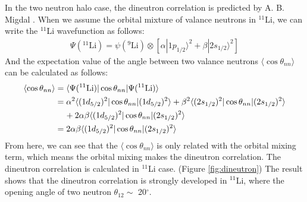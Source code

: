 

In the two neutron halo case, the dineutron correlation is predicted by A. B. Migdal \cite{Migdal}. 
When we assume the orbital mixture of valance neutrons in $^{11}$Li, we can write the $^{11}$Li wavefunction as follows:
\begin{align}
    \Psi(^{11}\text{Li}) = \psi(^{9}\text{Li}) \otimes [\alpha |1p_{1/2} \rangle^2 + \beta |2s_{1/2} \rangle^2]
\end{align}
And the expectation value of the angle between two valance neutrons $\langle \cos \theta_{nn} \rangle$ can be calculated as follows:
\begin{align}
    \langle \cos \theta_{nn} \rangle &= \langle \Psi({}^{11}\text{Li}) | \cos \theta_{nn} | \Psi({}^{11}\text{Li}) \rangle \notag \\
    &= \alpha^2 \langle (1d_{5/2})^2 | \cos \theta_{nn} | (1d_{5/2})^2 \rangle + \beta^2 \langle (2s_{1/2})^2 | \cos \theta_{nn} | (2s_{1/2})^2 \rangle \notag \\
    &\hspace{4mm} + 2\alpha \beta \langle (1d_{5/2})^2 | \cos \theta_{nn} | (2s_{1/2})^2 \rangle \notag \\
    &= 2\alpha \beta \langle (1d_{5/2})^2 | \cos \theta_{nn} | (2s_{1/2})^2 \rangle
\end{align}
From here, we can see that the $\langle \cos \theta_{nn}\rangle$ is only related with the orbital mixing term, which means the orbital mixing makes the dineutron correlation. The dineutron correlation is calculated in $^{11}$Li case. (Figure \ref{fig:dineutron}) The result shows that the dineutron correlation is strongly developed in $^{11}$Li, where the opening angle of two neutron $\theta_{12} \sim$ 20$^\circ$. 

